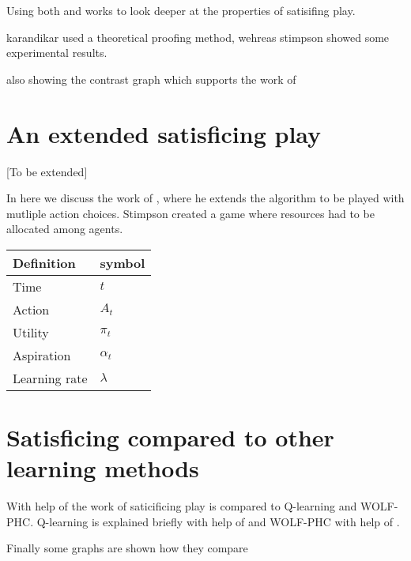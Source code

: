 Using both \citep{karandikar} and \citep{stimpson:2001} works to look deeper
at the properties of satisifing play. 

karandikar used a theoretical proofing method, wehreas stimpson showed some
experimental results.

also showing the contrast graph which supports the work of \citep{arthur}

\section{An extended satisficing play}
[To be extended]

In here we discuss the work of \citep{stimpson:2003}, where he extends the
algorithm to be played with mutliple action choices.
Stimpson created a game where resources had to be allocated among agents.


\begin{tabular}{ll}
  Definition & symbol \\ \toprule
  Time & $t$ \\
  Action & $A_t$ \\
  Utility & $\pi_t$ \\
  Aspiration & $\alpha_t$ \\
  Learning rate & $\lambda$ \\ \bottomrule
\end{tabular}

\section{Satisficing compared to other learning methods}
With help of the work of \citep{crandall} saticificing play is compared
to Q-learning and WOLF-PHC.
Q-learning is explained briefly with help of \citep{sandholm} and WOLF-PHC
with help of \citep{bowling}.
 
Finally some graphs are shown how they compare



\address{Jappie Klooster\\
  Dept. of Informatics\\
  Universiteit Utrecht\\
  The Netherlands\\}
